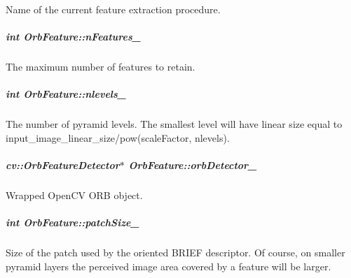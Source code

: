 Name of the current feature extraction procedure. 

\hypertarget{group___feature_extractor_a8fb8ef05ff3dff5ffee90c6f41e83cb2}{
\subparagraph[{n\-Features\-\_\-}]{\setlength{\rightskip}{0pt plus 5cm}int Orb\-Feature\-::n\-Features\-\_\-\hspace{0.3cm}{\ttfamily [private]}}}\label{group___feature_extractor_a8fb8ef05ff3dff5ffee90c6f41e83cb2}


The maximum number of features to retain. 

\hypertarget{group___feature_extractor_abfb07330bd1a63270f935e1317111300}{
\subparagraph[{nlevels\-\_\-}]{\setlength{\rightskip}{0pt plus 5cm}int Orb\-Feature\-::nlevels\-\_\-\hspace{0.3cm}{\ttfamily [private]}}}\label{group___feature_extractor_abfb07330bd1a63270f935e1317111300}


The number of pyramid levels. The smallest level will have linear size equal to input\-\_\-image\-\_\-linear\-\_\-size/pow(scale\-Factor, nlevels). 

\hypertarget{group___feature_extractor_afbddce112b372099591a6ec049aff0f5}{
\subparagraph[{orb\-Detector\-\_\-}]{\setlength{\rightskip}{0pt plus 5cm}cv\-::\-Orb\-Feature\-Detector$\ast$ Orb\-Feature\-::orb\-Detector\-\_\-\hspace{0.3cm}{\ttfamily [private]}}}\label{group___feature_extractor_afbddce112b372099591a6ec049aff0f5}


Wrapped Open\-C\-V O\-R\-B object. 

\hypertarget{group___feature_extractor_ae7f8a68d8b86f650348bc213c43f593a}{
\subparagraph[{patch\-Size\-\_\-}]{\setlength{\rightskip}{0pt plus 5cm}int Orb\-Feature\-::patch\-Size\-\_\-\hspace{0.3cm}{\ttfamily [private]}}}\label{group___feature_extractor_ae7f8a68d8b86f650348bc213c43f593a}


Size of the patch used by the oriented B\-R\-I\-E\-F descriptor. Of course, on smaller pyramid layers the perceived image area covered by a feature will be larger. 

